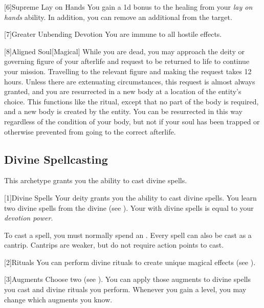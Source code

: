         [6]{Supreme Lay on Hands}
        You gain a \plus1d bonus to the healing from your \textit{lay on hands} ability.
        In addition, you can remove an additional  from the target.

        [7]{Greater Unbending Devotion}
        You are immune to all hostile  effects.

        [8]{Aligned Soul}[Magical]
        While you are dead, you may approach the deity or governing figure of your afterlife and request to be returned to life to continue your mission.
        Travelling to the relevant figure and making the request takes 12 hours.
        Unless there are extenuating circumstances, this request is almost always granted, and you are resurrected in a new body at a location of the entity's choice.
        This functions like the  ritual, except that no part of the body is required, and a new body is created by the entity.
        You can be resurrected in this way regardless of the condition of your body, but not if your soul has been trapped or otherwise prevented from going to the correct afterlife.

    \subsection{Divine Spellcasting}
        This archetype grants you the ability to cast divine spells.

        [1]{Divine Spells}
        Your deity grants you the ability to cast divine spells.
        You learn two divine spells from the divine  (see ).
        Your  with divine spells is equal to your \textit{devotion power}.

        To cast a spell, you must normally spend an .
        Every spell can also be cast as a cantrip.
        Cantrips are weaker, but do not require action points to cast.

        [2]{Rituals}
        You can perform divine rituals to create unique magical effects (see ).

        [3]{Augments}
        Choose two  (see ).
        You can apply those augments to divine spells you cast and divine rituals you perform.
        Whenever you gain a level, you may change which augments you know.

